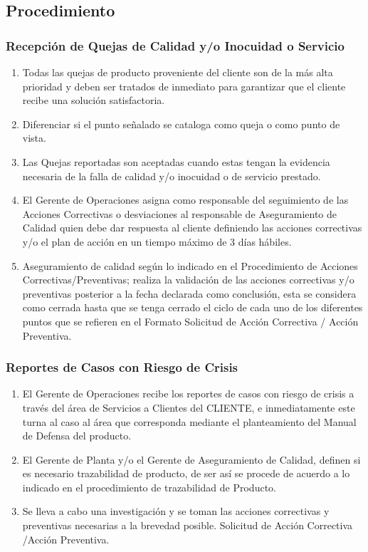 \subsection{Procedimiento}

\subsubsection{Recepción de Quejas de Calidad y/o Inocuidad o Servicio}

\begin{enumerate}
	\item Todas las quejas de producto proveniente del cliente son de la más alta prioridad y deben ser tratados de inmediato para garantizar que el cliente recibe una solución satisfactoria.
	\item Diferenciar si el punto señalado se cataloga como queja o como punto de vista.
	\item Las Quejas reportadas son aceptadas cuando estas tengan la evidencia necesaria de la falla de calidad y/o inocuidad o de servicio prestado.
	\item El Gerente de Operaciones asigna como responsable del seguimiento de las Acciones Correctivas o desviaciones al responsable de Aseguramiento de Calidad quien debe dar respuesta al cliente definiendo las acciones correctivas y/o el plan de acción en un tiempo máximo de 3 días hábiles.
	\item Aseguramiento de calidad según lo indicado en el Procedimiento de Acciones Correctivas/Preventivas; realiza la validación de las acciones correctivas y/o preventivas posterior a la fecha declarada como conclusión, esta se considera como cerrada hasta que se tenga cerrado el ciclo de cada uno de los diferentes puntos que se refieren en el Formato Solicitud de Acción Correctiva / Acción Preventiva.
\end{enumerate}

\subsubsection{Reportes de Casos con Riesgo de Crisis}

\begin{enumerate}
	\item El Gerente de Operaciones recibe los reportes de casos con riesgo de crisis a través del área de Servicios a Clientes del CLIENTE, e inmediatamente este turna al caso al área que corresponda mediante el planteamiento del Manual de Defensa del producto.
	\item El Gerente de Planta y/o el Gerente de Aseguramiento de Calidad, definen si es necesario trazabilidad de producto, de ser así se procede de acuerdo a lo indicado en el procedimiento de trazabilidad de Producto.
	\item Se lleva a cabo una investigación y se toman las acciones correctivas y preventivas necesarias a la brevedad posible. Solicitud de Acción Correctiva /Acción Preventiva.
\end{enumerate}

